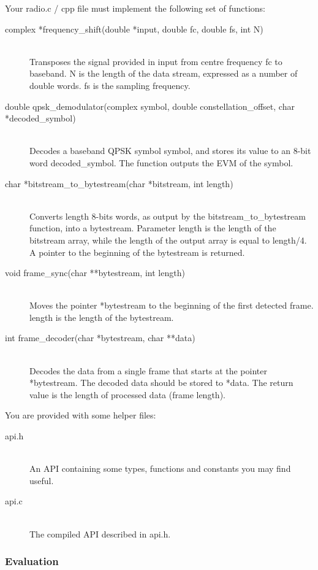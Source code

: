 \documentclass{article}
\begin{document}
Your \textsf{radio.c / cpp} file must implement the following set of functions:
\begin{description}
	\item[complex *frequency\_shift(double *input, double fc, double fs, int N)]
	\,\\ Transposes the signal provided in input from centre frequency \textsf{fc} to baseband. \textsf{N} is the length of the data stream, expressed as a number of double words. \textsf{fs} is the sampling frequency.
	\item[double qpsk\_demodulator(complex symbol, double constellation\_offset, char *decoded\_symbol)]
	\,\\ Decodes a baseband QPSK symbol \textsf{symbol}, and stores its value to an 8-bit word \textsf{decoded\_symbol}. The function outputs the EVM of the symbol.
	\item[char *bitstream\_to\_bytestream(char *bitstream, int length)]
	\,\\ Converts \textsf{length} 8-bits words, as output by the \textsf{bitstream\_to\_bytestream} function, into a bytestream. Parameter \textsf{length} is the length of the bitstream array, while the length of the output array is equal to \textsf{length}/4. A pointer to the beginning of the bytestream is returned.
	\item[void frame\_sync(char **bytestream, int length)]
	\,\\ Moves the pointer \textsf{*bytestream} to the beginning of the first detected frame. \textsf{length} is the length of the bytestream.
	\item[int frame\_decoder(char *bytestream, char **data)]
	\,\\ Decodes the data from a single frame that starts at the pointer \textsf{*bytestream}. The decoded data should be stored to \textsf{*data}. The return value is the length of processed data (frame length).
\end{description}

You are provided with some helper files:
\begin{description}
	\item[api.h]
	\,\\ An API containing some types, functions and constants you may find useful.
	\item[api.c]
	\,\\ The compiled API described in \textsf{api.h}.
\end{description}


\subsubsection{Evaluation}
\end{document}

